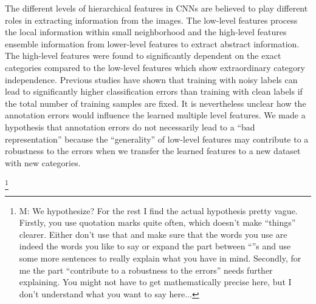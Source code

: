 \noindent
The different levels of hierarchical features in CNNs are believed to play different roles in extracting information from the images.
The low-level features process the local information within small neighborhood and the high-level features ensemble information from lower-level features to extract abstract information.
The high-level features were found to significantly dependent on the exact categories compared to the low-level features which show extraordinary category independence.\cite{yosinski2014transferable}
Previous studies\cite{sukhbaatar2014training,patrini2016making} have shown that training with noisy labels can lead to significantly higher classification errors than training with clean labels if the total number of training samples are fixed.
It is nevertheless unclear how the annotation errors would influence the learned multiple level features.
We made a hypothesis that annotation errors do not necessarily lead to a ``bad representation'' because the ``generality'' of low-level features may contribute to a robustness to the errors when we transfer the learned features to a new dataset with new categories.

\footnote{M: We hypothesize?
For the rest I find the actual hypothesis pretty vague.  Firstly, you use quotation marks quite often, which doesn't make ``things'' clearer.  Either don't use that and make sure that the words you use are indeed the words you like to say or expand the part between ``''s and use some more sentences to really explain what you have in  mind.  Secondly, for me the part ``contribute to a robustness to the errors'' needs further explaining.  You might not have to get mathematically precise here, but I don't understand what you want to say here...}

